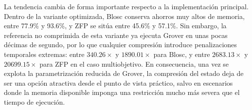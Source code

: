 La tendencia cambia de forma importante respecto a la implementación principal. Dentro de la
variante optimizada, Blosc conserva ahorros muy altos de memoria, entre 77.9\% y 93.6\%, y
ZFP se sitúa entre 45.6\% y 57.1\%. Sin embargo, la referencia no comprimida de esta variante
ya ejecuta Grover en unas pocas décimas de segundo, por lo que cualquier compresión introduce
penalizaciones temporales extremas: entre $340.26\times$ y $1890.01\times$ para Blosc, y entre
$2683.13\times$ y $20699.15\times$ para ZFP en el caso multiobjetivo. En consecuencia, una vez
se explota la parametrización reducida de Grover, la compresión del estado deja de ser una
opción atractiva desde el punto de vista práctico, salvo en escenarios donde la memoria
disponible imponga una restricción mucho más severa que el tiempo de ejecución.
